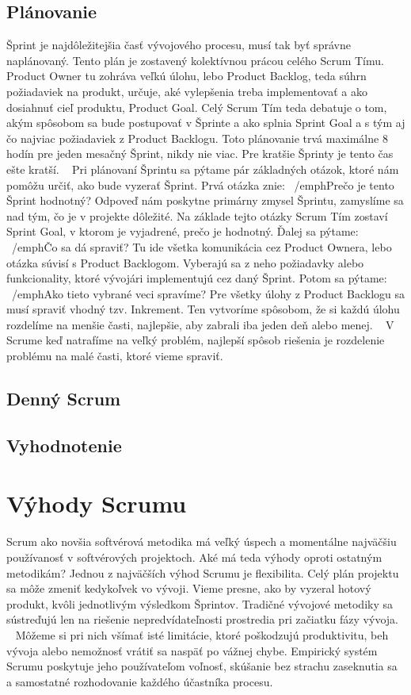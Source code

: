 \documentclass[10pt,slovak,a4paper]{article}
\begin{document}
\subsection{Plánovanie}

Šprint je najdôležitejšia časť vývojového procesu, musí tak byť správne naplánovaný. Tento plán je zostavený kolektívnou prácou celého Scrum Tímu. Product Owner tu zohráva veľkú úlohu, lebo Product Backlog, teda súhrn požiadaviek na produkt, určuje, aké vylepšenia treba implementovať a ako dosiahnuť cieľ produktu, Product Goal. Celý Scrum Tím teda debatuje o tom, akým spôsobom sa bude postupovať v Šprinte a ako splnia Sprint Goal a s tým aj čo najviac požiadaviek z Product Backlogu. Toto plánovanie trvá maximálne 8 hodín pre jeden mesačný Šprint, nikdy nie viac. Pre kratšie Šprinty je tento čas ešte kratší. ~\cite{schwaber2020scrum}
Pri plánovaní Šprintu sa pýtame pár základných otázok, ktoré nám pomôžu určiť, ako bude vyzerať Šprint. Prvá otázka znie: ~/emph{Prečo je tento Šprint hodnotný?} Odpoveď nám poskytne primárny zmysel Šprintu, zamyslíme sa nad tým, čo je v projekte dôležité. Na základe tejto otázky Scrum Tím zostaví Sprint Goal, v ktorom je vyjadrené, prečo je hodnotný. Ďalej sa pýtame: ~/emph{Čo sa dá spraviť?} Tu ide všetka komunikácia cez Product Ownera, lebo otázka súvisí s Product Backlogom. Vyberajú sa z neho požiadavky alebo funkcionality, ktoré vývojári implementujú cez daný Šprint. Potom sa pýtame: ~/emph{Ako tieto vybrané veci spravíme?} Pre všetky úlohy z Product Backlogu sa musí spraviť vhodný tzv. Inkrement. Ten vytvoríme spôsobom, že si každú úlohu rozdelíme na menšie časti, najlepšie, aby zabrali iba jeden deň alebo menej. ~\cite{schwaber2020scrum} V Scrume keď natrafíme na veľký problém, najlepší spôsob riešenia je rozdelenie problému na malé časti, ktoré vieme spraviť.


\subsection{Denný Scrum}

\subsection{Vyhodnotenie}

\section{Výhody Scrumu} \label{vyhody}

Scrum ako novšia softvérová metodika má veľký úspech a momentálne najväčšiu používanosť v softvérových projektoch. Aké má teda výhody oproti ostatným metodikám? Jednou z najväčších výhod Scrumu je flexibilita. Celý plán projektu sa môže zmeniť kedykoľvek vo vývoji. Vieme presne, ako by vyzeral hotový produkt, kvôli jednotlivým výsledkom Šprintov. Tradičné vývojové metodiky sa sústreďujú len na riešenie nepredvídateľnosti prostredia pri začiatku fázy vývoja. ~\cite{schwaber1997scrum} Môžeme si pri nich všímať isté limitácie, ktoré poškodzujú produktivitu, beh vývoja alebo nemožnosť vrátiť sa naspäť po vážnej chybe. Empirický systém Scrumu poskytuje jeho používateľom voľnosť, skúšanie bez strachu zaseknutia sa a samostatné rozhodovanie každého účastníka procesu.
\end{document}
